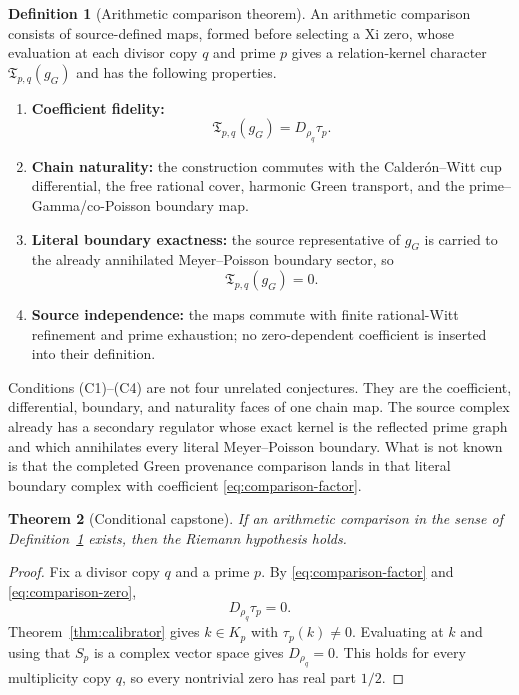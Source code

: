 \documentclass[11pt]{article}
\newtheorem{theorem}{Theorem}[section]
\theoremstyle{definition}
\newtheorem{definition}[theorem]{Definition}
\theoremstyle{remark}
\numberwithin{equation}{section}
\begin{document}
\begin{definition}[Arithmetic comparison theorem]
\label{def:comparison}
An arithmetic comparison consists of source-defined maps, formed before
selecting a Xi zero, whose evaluation at each divisor copy $q$ and prime
$p$ gives a relation-kernel character $\mathfrak T_{p,q}(g_G)$ and has the
following properties.
\begin{enumerate}[label=(C\arabic*)]
\item \textbf{Coefficient fidelity:}
\begin{equation}
                    \mathfrak T_{p,q}(g_G)=D_{\rho_q}\tau_p.
 \label{eq:comparison-factor}
\end{equation}
\item \textbf{Chain naturality:} the construction commutes with the
Calder\'on--Witt cup differential, the free rational cover, harmonic Green
transport, and the prime--Gamma/co-Poisson boundary map.
\item \textbf{Literal boundary exactness:} the source representative of
$g_G$ is carried to the already annihilated Meyer--Poisson boundary sector,
so
\begin{equation}
                           \mathfrak T_{p,q}(g_G)=0.
 \label{eq:comparison-zero}
\end{equation}
\item \textbf{Source independence:} the maps commute with finite
rational-Witt refinement and prime exhaustion; no zero-dependent coefficient
is inserted into their definition.
\end{enumerate}
\end{definition}

Conditions (C1)--(C4) are not four unrelated conjectures.  They are the
coefficient, differential, boundary, and naturality faces of one chain map.
The source complex already has a secondary regulator whose exact kernel is
the reflected prime graph and which annihilates every literal
Meyer--Poisson boundary.  What is not known is that the completed Green
provenance comparison lands in that literal boundary complex with
coefficient \eqref{eq:comparison-factor}.

\begin{theorem}[Conditional capstone]
\label{thm:conditional-capstone}
If an arithmetic comparison in the sense of
Definition~\ref{def:comparison} exists, then the Riemann hypothesis holds.
\end{theorem}

\begin{proof}
Fix a divisor copy $q$ and a prime $p$.  By
\eqref{eq:comparison-factor} and \eqref{eq:comparison-zero},
\[
                              D_{\rho_q}\tau_p=0.
\]
Theorem~\ref{thm:calibrator} gives $k\in K_p$ with $\tau_p(k)\ne0$.
Evaluating at $k$ and using that $S_p$ is a complex vector space gives
$D_{\rho_q}=0$.  This holds for every multiplicity copy $q$, so every
nontrivial zero has real part $1/2$.
\end{proof}
\end{document}
